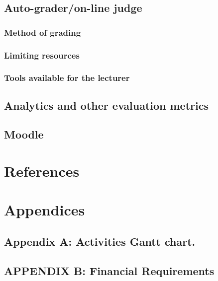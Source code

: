 \documentclass[11pt]{article}
\begin{document}
	\subsection{Auto-grader/on-line judge}
		\subsubsection{Method of grading}
		\subsubsection{Limiting resources}
		\subsubsection{Tools available for the lecturer}
	\subsection{Analytics and other evaluation metrics}
	\subsection{Moodle}

\section{References}

\section{Appendices}
	\subsection{Appendix A: Activities Gantt chart.}
	\subsection{APPENDIX B: Financial Requirements}
\end{document}

